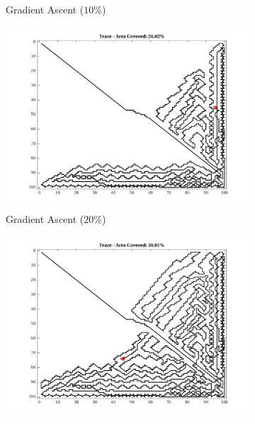 \begin{figure}[htb!]
\begin{subfigure}[t]{0.32\textwidth}
        \ssp
        \captionsetup{skip=0.20\baselineskip,size=footnotesize}
        \caption{Gradient Ascent ($10\%$)}
    \end{subfigure}%
    \begin{subfigure}[t]{0.32\textwidth}
        \centering
        \includegraphics[width=\linewidth]{figures/hbresults/path_gradient_20p_100x100_sf_1_seed_2.png}
        \ssp
        \captionsetup{skip=0.20\baselineskip,size=footnotesize}
        \caption{Gradient Ascent ($20\%$)}
    \end{subfigure}%
    \begin{subfigure}[t]{0.32\textwidth}
        \centering
        \includegraphics[width=\linewidth]{figures/hbresults/path_gradient_30p_100x100_sf_1_seed_2.png}

\end{subfigure}
\end{figure}
